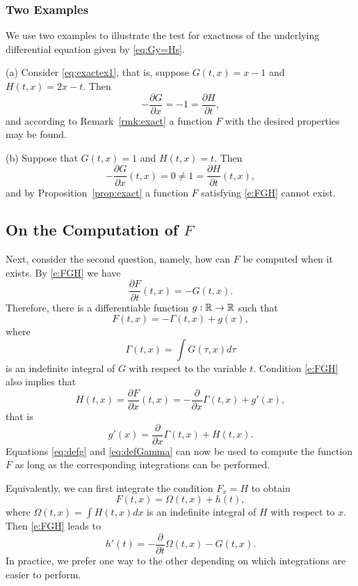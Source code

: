 \documentclass{ximera}
\begin{document}
\subsubsection*{Two Examples}

We use two examples to illustrate the test for exactness
of the underlying differential equation given by \eqref{eq:Gy=Hs}.

\noindent (a) Consider \eqref{eq:exactex1}, that is, suppose $G(t,x)=x-1$ and 
$H(t,x)=2x-t$.  Then
\[
-\frac{\partial G}{\partial x} = -1 = 
\frac{\partial H}{\partial t},
\]
and according to Remark~\ref{rmk:exact} a function $F$ with the desired 
properties may be found.

\noindent (b) Suppose that $G(t,x) = 1$ and $H(t,x) = t$.  Then 
\[
-\frac{\partial G}{\partial x} (t,x) = 0\not= 1 = 
\frac{\partial H}{\partial t} (t,x),
\]
and by Proposition~\ref{prop:exact} a function $F$ satisfying \eqref{e:FGH} 
cannot exist.

\subsection*{On the Computation of $F$}
Next, consider the second question, namely, how can $F$ be
computed when it exists.  By \eqref{e:FGH} we have
\[
\frac{\partial F}{\partial t}(t,x) = -G(t,x).
\]
Therefore, there is a differentiable function $g:\mbox{$\Bbb{R}$}\to\mbox{$\Bbb{R}$}$ such
that
\begin{equation}  \label{eq:defGamma}
F(t,x) = -\Gamma(t,x) + g(x),
\end{equation}
where 
\[
\Gamma(t,x)=\int G(\tau,x) d\tau
\]
is an indefinite integral of $G$ with respect to the variable $t$.
Condition \eqref{e:FGH} also implies that
\[
H(t,x) = \frac{\partial F}{\partial x}(t,x) =
-\frac{\partial}{\partial x}\Gamma(t,x) + g'(x),
\]
that is
\begin{equation} \label{eq:defg}
g'(x) = \frac{\partial}{\partial x}\Gamma(t,x) + H(t,x).
\end{equation}
Equations \eqref{eq:defg} and \eqref{eq:defGamma} can now be used 
to compute the function $F$ as long as the corresponding
integrations can be performed.  

Equivalently, we can first integrate the condition $F_x=H$ to obtain
\begin{equation}  \label{eq:excond}
F(t,x) = \Omega(t,x) + h(t),
\end{equation}
where $\Omega(t,x)=\int H(t,x)dx$ is an indefinite integral of $H$ with
respect to $x$.  Then \eqref{e:FGH} leads to
\[
h'(t) = -\frac{\partial}{\partial t}\Omega(t,x) - G(t,x).
\]
In practice, we prefer one way to the other depending on which
integrations are easier to perform.
\end{document}

